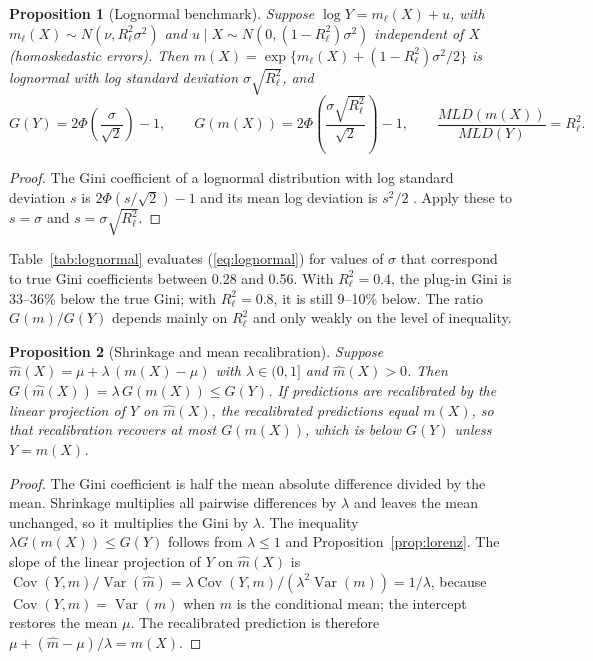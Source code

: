 \documentclass[pdflatex,sn-mathphys-ay]{sn-jnl}
\theoremstyle{thmstyleone}%
\newtheorem{proposition}{Proposition}%
\theoremstyle{thmstyletwo}%
\theoremstyle{thmstylethree}%
\newcommand{\Var}{\operatorname{Var}}
\newcommand{\Cov}{\operatorname{Cov}}
\begin{document}
\begin{proposition}[Lognormal benchmark]\label{prop:lognormal}
Suppose $\log Y=m_\ell(X)+u$, with $m_\ell(X)\sim N(\nu,R^2_\ell\sigma^2)$ and $u\mid X\sim N(0,(1-R^2_\ell)\sigma^2)$ independent of $X$ (homoskedastic errors). Then $m(X)=\exp\{m_\ell(X)+(1-R^2_\ell)\sigma^2/2\}$ is lognormal with log standard deviation $\sigma\sqrt{R^2_\ell}$, and
\begin{equation}
G(Y)=2\Phi\left(\frac{\sigma}{\sqrt 2}\right)-1, \qquad G(m(X))=2\Phi\left(\frac{\sigma\sqrt{R^2_\ell}}{\sqrt 2}\right)-1, \qquad \frac{MLD(m(X))}{MLD(Y)}=R^2_\ell. \label{eq:lognormal}
\end{equation}
\end{proposition}

\begin{proof}
The Gini coefficient of a lognormal distribution with log standard deviation $s$ is $2\Phi(s/\sqrt2)-1$ and its mean log deviation is $s^2/2$ \citep{cowell2011}. Apply these to $s=\sigma$ and $s=\sigma\sqrt{R^2_\ell}$.
\end{proof}

Table~\ref{tab:lognormal} evaluates (\ref{eq:lognormal}) for values of $\sigma$ that correspond to true Gini coefficients between 0.28 and 0.56. With $R^2_\ell=0.4$, the plug-in Gini is 33--36\% below the true Gini; with $R^2_\ell=0.8$, it is still 9--10\% below. The ratio $G(m)/G(Y)$ depends mainly on $R^2_\ell$ and only weakly on the level of inequality.



\begin{proposition}[Shrinkage and mean recalibration]\label{prop:shrink}
Suppose $\hat m(X)=\mu+\lambda\,(m(X)-\mu)$ with $\lambda\in(0,1]$ and $\hat m(X)>0$. Then $G(\hat m(X))=\lambda\,G(m(X))\leq G(Y)$. If predictions are recalibrated by the linear projection of $Y$ on $\hat m(X)$, the recalibrated predictions equal $m(X)$, so that recalibration recovers at most $G(m(X))$, which is below $G(Y)$ unless $Y=m(X)$.
\end{proposition}

\begin{proof}
The Gini coefficient is half the mean absolute difference divided by the mean. Shrinkage multiplies all pairwise differences by $\lambda$ and leaves the mean unchanged, so it multiplies the Gini by $\lambda$. The inequality $\lambda G(m(X))\leq G(Y)$ follows from $\lambda\leq 1$ and Proposition~\ref{prop:lorenz}. The slope of the linear projection of $Y$ on $\hat m(X)$ is $\Cov(Y,\hat m)/\Var(\hat m)=\lambda\Cov(Y,m)/(\lambda^2\Var(m))=1/\lambda$, because $\Cov(Y,m)=\Var(m)$ when $m$ is the conditional mean; the intercept restores the mean $\mu$. The recalibrated prediction is therefore $\mu+(\hat m-\mu)/\lambda=m(X)$.
\end{proof}
\end{document}
